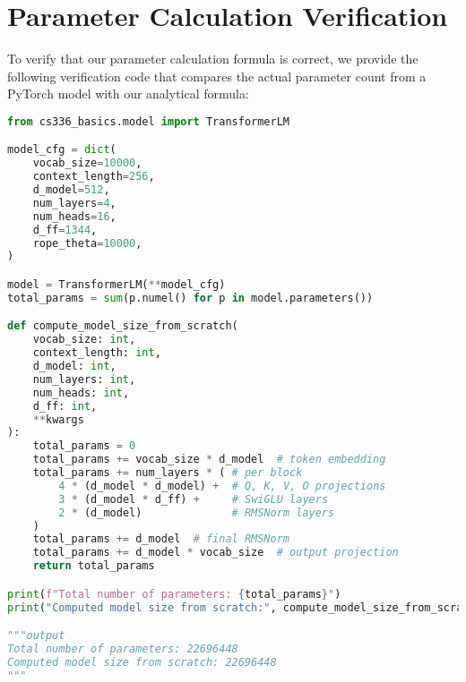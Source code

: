 \section{Parameter Calculation Verification}
\label{sec:param-verification}

To verify that our parameter calculation formula is correct, we provide the following verification code that compares the actual parameter count from a PyTorch model with our analytical formula:

\begin{lstlisting}[language=Python, caption={Parameter count verification code}]
from cs336_basics.model import TransformerLM

model_cfg = dict(
    vocab_size=10000,
    context_length=256,
    d_model=512,
    num_layers=4,
    num_heads=16,
    d_ff=1344, 
    rope_theta=10000,
)

model = TransformerLM(**model_cfg)
total_params = sum(p.numel() for p in model.parameters())

def compute_model_size_from_scratch(
    vocab_size: int,
    context_length: int,
    d_model: int,
    num_layers: int,
    num_heads: int,
    d_ff: int,
    **kwargs
):
    total_params = 0
    total_params += vocab_size * d_model  # token embedding
    total_params += num_layers * ( # per block
        4 * (d_model * d_model) +  # Q, K, V, O projections
        3 * (d_model * d_ff) +     # SwiGLU layers
        2 * (d_model)              # RMSNorm layers
    )
    total_params += d_model  # final RMSNorm
    total_params += d_model * vocab_size  # output projection
    return total_params

print(f"Total number of parameters: {total_params}")     
print("Computed model size from scratch:", compute_model_size_from_scratch(**model_cfg))

"""output
Total number of parameters: 22696448
Computed model size from scratch: 22696448
"""
\end{lstlisting}
